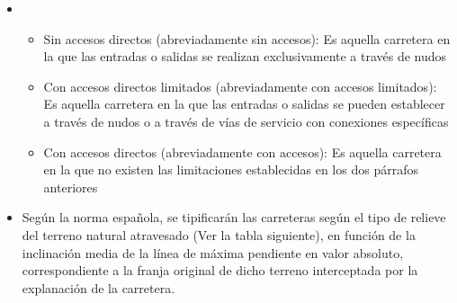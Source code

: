 \documentclass[letterpaper,10pt,english]{sphinxmanual}
\begin{document}
\begin{itemize}
\item {} 
\begin{itemize}
\item {} 
Sin accesos directos (abreviadamente sin accesos): Es aquella carretera en la que las entradas o salidas se realizan exclusivamente a través de nudos

\item {} 
Con accesos directos limitados (abreviadamente con accesos limitados): Es aquella carretera en la que las entradas o salidas se pueden establecer a través de nudos o a través de vías de servicio con conexiones específicas

\item {} 
Con accesos directos (abreviadamente con accesos): Es aquella carretera en la que no existen las limitaciones establecidas en los dos párrafos anteriores

\end{itemize}

\item {} 
 Según la norma española, se tipificarán las carreteras según el tipo de relieve del terreno natural atravesado (Ver la tabla siguiente), en función de la inclinación media de la línea de máxima pendiente en valor absoluto, correspondiente a la franja original de dicho terreno interceptada por la explanación de la carretera.

\end{itemize}
\end{document}
